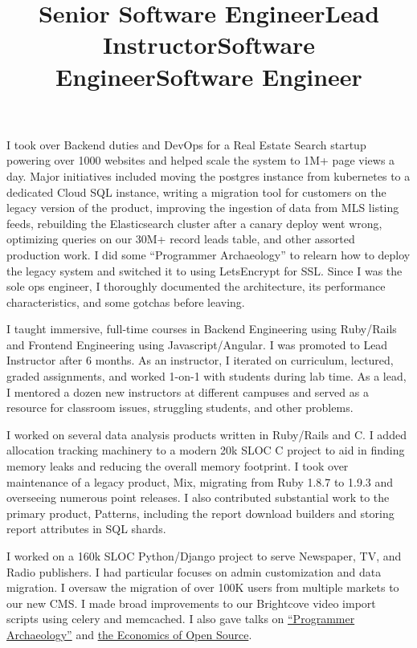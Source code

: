 \documentclass[margintitle,line]{res}
\begin{document}
\begin{resume}
\title{Senior Software Engineer}
\begin{position}
  I took over Backend duties and DevOps for a Real Estate Search startup powering over 1000
  websites and helped scale the system to 1M+ page views a day. Major initiatives included moving
  the postgres instance from kubernetes to a dedicated Cloud SQL instance, writing a migration
  tool for customers on the legacy version of the product, improving the ingestion of data from
  MLS listing feeds, rebuilding the Elasticsearch cluster after a canary deploy went wrong,
  optimizing queries on our 30M+ record leads table, and other assorted production work.
  I did some ``Programmer Archaeology'' to relearn how to deploy the legacy system
  and switched it to using LetsEncrypt for SSL. Since I was the sole ops engineer, I thoroughly
  documented the architecture, its performance characteristics, and some gotchas before leaving.
\end{position}

\title{Lead Instructor}
\begin{position}
  I taught immersive, full-time courses in Backend Engineering using Ruby/Rails and Frontend Engineering using Javascript/Angular.
  I was promoted to Lead Instructor after 6 months. As an instructor, I iterated
  on curriculum, lectured, graded assignments, and worked 1-on-1 with students
  during lab time. As a lead, I mentored a dozen new instructors at different
  campuses and served as a resource for classroom issues, struggling students,
  and other problems.
\end{position}

\title{Software Engineer}
\begin{position}
  I worked on several data analysis products written in Ruby/Rails and C.
  I added allocation tracking machinery to a modern 20k SLOC C project to aid
  in finding memory leaks and reducing the overall memory footprint. I took
  over maintenance of a legacy product, Mix, migrating from Ruby 1.8.7 to 1.9.3
  and overseeing numerous point releases. I also contributed substantial work
  to the primary product, Patterns, including the report download builders and
  storing report attributes in SQL shards.
\end{position}

\title{Software Engineer}
\begin{position}
  I worked on a 160k SLOC Python/Django project to serve Newspaper,
  TV, and Radio publishers. I had particular focuses on admin
  customization and data migration. I oversaw the migration of over
  100K users from multiple markets to our new CMS.
  I made broad improvements to our Brightcove video import
  scripts using celery and memcached. I also gave talks on
  \href{http://redlinernotes.com/docs/talks/opa.html}{``Programmer
    Archaeology''} and
  \href{http://redlinernotes.com/docs/talks/wosw.html}{the Economics
    of Open Source}.
\end{position}


\end{resume}
\end{document}
